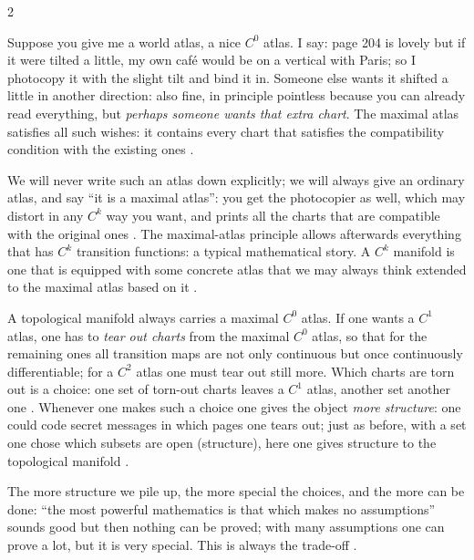 \begin{paracol}{2}
\begin{intuition}
Suppose you give me a world atlas, a nice $C^0$ atlas. I say: page 204 is lovely but if it were tilted a little, my own
café would be on a vertical with Paris; so I photocopy it with the slight tilt and bind it in. Someone else wants it shifted a little
in another direction: also fine, in principle pointless because you can already read everything, but \emph{perhaps someone
wants that extra chart}. The maximal atlas satisfies all such wishes: it contains every chart that satisfies the
compatibility condition with the existing ones .\par
We will never write such an atlas down explicitly; we will always give an ordinary atlas, and say ``it is a maximal atlas'':
you get the photocopier as well, which may distort in any $C^k$ way you want, and prints all the charts that are
compatible with the original ones . The maximal-atlas principle
allows afterwards everything that has $C^k$ transition functions: a typical mathematical story. A $C^k$ manifold is one
that is equipped with some concrete atlas that we may always think extended to the maximal atlas based on it
.
\end{intuition}

A topological manifold always carries a maximal $C^0$ atlas. If one wants a $C^1$ atlas, one has to \emph{tear out charts} from
the maximal $C^0$ atlas, so that for the remaining ones all transition maps are not only continuous but once continuously
differentiable; for a $C^2$ atlas one must tear out still more. Which charts are torn out is a choice: one set of torn-out
charts leaves a $C^1$ atlas, another set another one .
Whenever one makes such a choice one gives the object \emph{more structure}: one could code secret messages in which pages
one tears out; just as before, with a set one chose which subsets are open (structure), here one gives structure to the
topological manifold .

\begin{intuition}
The more structure we pile up, the more special the choices, and the more can be done: ``the most powerful mathematics is that
which makes no assumptions'' sounds good but then nothing can be proved; with many assumptions one can prove a lot, but it
is very special. This is always the trade-off .
\end{intuition}


\end{paracol}
